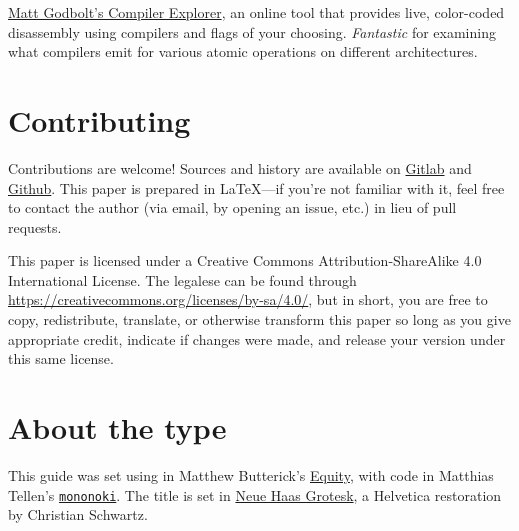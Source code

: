 \documentclass[fontsize=10pt, numbers=endperiod]{scrartcl}
\begin{document}
\begin{adjustwidth}{1in}{1in}
\href{https://godbolt.org/}{Matt Godbolt's Compiler Explorer},
an online tool that provides live, color-coded disassembly using compilers and
flags of your choosing.
\emph{Fantastic} for examining what compilers emit for various
atomic operations on different architectures.

\section{Contributing}

Contributions are welcome!
Sources and history are available on
\href{https://gitlab.com/mrkline/concurrency-primer}{Gitlab}
and
\href{https://github.com/mrkline/concurrency-primer}{Github}.
This paper is prepared in \LaTeX{}---if you're not familiar with it,
feel free to contact the author
(via email, by opening an issue, etc.)
in lieu of pull requests.

This paper is licensed under a
Creative Commons Attribution-ShareAlike 4.0 International License.
The legalese can be found through
\url{https://creativecommons.org/licenses/by-sa/4.0/},
but in short,
you are free to copy, redistribute, translate, or otherwise transform this paper
so long as you give appropriate credit, indicate if changes were made,
and release your version under this same license.

\section{About the type}

This guide was set using \LuaLaTeX{}
in Matthew Butterick's
\href{https://typographyforlawyers.com/equity.html}{Equity},
with code in Matthias Tellen's
\href{https://madmalik.github.io/mononoki/}{\texttt{mononoki}}.
The title is set in
\href{http://www.fontbureau.com/NHG/}{\textsf{\small Neue Haas Grotesk}},
a Helvetica restoration by Christian Schwartz.
\end{adjustwidth}
\end{document}
